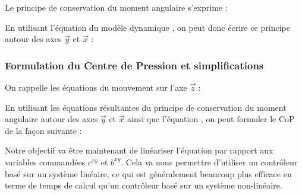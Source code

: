 				Le principe de conservation du moment angulaire s'exprime :
				
				En utilisant l'équation du modèle dynamique , on peut donc écrire ce principe autour des axes $\vec{y}$ et $\vec{x}$ :
				
			\subsubsection{Formulation du Centre de Pression et simplifications}
			
				On rappelle les équations du mouvement sur l'axe $\vec{z}$  :
			
				En utilisant les équations résultantes du principe de conservation du moment angulaire autour des axes $\vec{y}$ et $\vec{x}$  ainsi que l'équation , on peut formuler le CoP de la façon suivante :	
				
				Notre objectif va être maintenant de linéariser l'équation  par rapport aux variables commandées $c^{xy}$ et $b^{xy}$.
				Cela va nous permettre d'utiliser un contrôleur basé sur un système linéaire, ce qui est généralement beaucoup plus efficace en terme de temps de calcul qu'un contrôleur basé sur un système non-linéaire.
				
